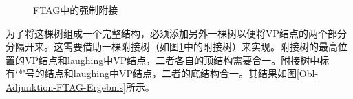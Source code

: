 \begin{figure}
\caption{\label{Obl-Adjunktion-FTAG}FTAG中的强制附接}
\end{figure}%
为了将这棵树组成一个完整结构，必须添加另外一棵树以便将VP结点的两个部分分隔开来。这需要借助一棵附接树（如图\ref{Obl-Adjunktion-FTAG}中的附接树）来实现。附接树的最高位置的VP结点和laughing中VP结点，二者各自的顶结构需要合一。附接树中标有`*'号的结点和laughing中VP结点，二者的底结构合一。其结果如图\vref{Obl-Adjunktion-FTAG-Ergebnis}所示。
